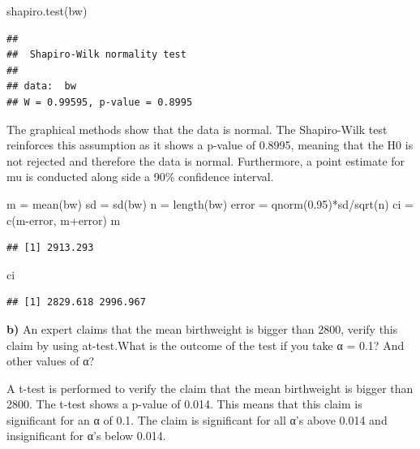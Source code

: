 \documentclass[
]{article}
\newenvironment{Shaded}{\begin{snugshade}}{\end{snugshade}}
\newcommand{\FloatTok}[1]{\textcolor[rgb]{0.00,0.00,0.81}{#1}}
\newcommand{\FunctionTok}[1]{\textcolor[rgb]{0.00,0.00,0.00}{#1}}
\newcommand{\NormalTok}[1]{#1}
\newcommand{\OtherTok}[1]{\textcolor[rgb]{0.56,0.35,0.01}{#1}}
\newcommand{\SpecialCharTok}[1]{\textcolor[rgb]{0.00,0.00,0.00}{#1}}
\begin{document}
\begin{Shaded}
\begin{Highlighting}[]
\FunctionTok{shapiro.test}\NormalTok{(bw)}
\end{Highlighting}
\end{Shaded}

\begin{verbatim}
## 
##  Shapiro-Wilk normality test
## 
## data:  bw
## W = 0.99595, p-value = 0.8995
\end{verbatim}

The graphical methods show that the data is normal. The Shapiro-Wilk
test reinforces this assumption as it shows a p-value of 0.8995, meaning
that the H0 is not rejected and therefore the data is normal.
Furthermore, a point estimate for mu is conducted along side a 90\%
confidence interval.

\begin{Shaded}
\begin{Highlighting}[]
\NormalTok{m }\OtherTok{=} \FunctionTok{mean}\NormalTok{(bw)}
\NormalTok{sd }\OtherTok{=} \FunctionTok{sd}\NormalTok{(bw)}
\NormalTok{n }\OtherTok{=} \FunctionTok{length}\NormalTok{(bw)}
\NormalTok{error }\OtherTok{=} \FunctionTok{qnorm}\NormalTok{(}\FloatTok{0.95}\NormalTok{)}\SpecialCharTok{*}\NormalTok{sd}\SpecialCharTok{/}\FunctionTok{sqrt}\NormalTok{(n)}
\NormalTok{ci }\OtherTok{=} \FunctionTok{c}\NormalTok{(m}\SpecialCharTok{{-}}\NormalTok{error, m}\SpecialCharTok{+}\NormalTok{error)}
\NormalTok{m}
\end{Highlighting}
\end{Shaded}

\begin{verbatim}
## [1] 2913.293
\end{verbatim}

\begin{Shaded}
\begin{Highlighting}[]
\NormalTok{ci}
\end{Highlighting}
\end{Shaded}

\begin{verbatim}
## [1] 2829.618 2996.967
\end{verbatim}

\textbf{b)} An expert claims that the mean birthweight is bigger than
2800, verify this claim by using at-test.What is the outcome of the test
if you take α = 0.1? And other values of α?

A t-test is performed to verify the claim that the mean birthweight is
bigger than 2800. The t-test shows a p-value of 0.014. This means that
this claim is significant for an α of 0.1. The claim is significant for
all α's above 0.014 and insignificant for α's below 0.014.
\end{document}
